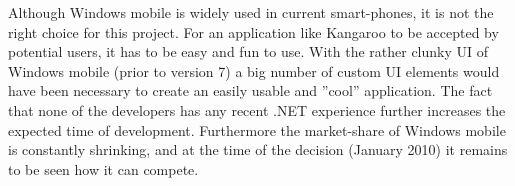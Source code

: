 Although Windows mobile is widely used in current smart-phones, it is not the right choice for this project. For an application like Kangaroo to be accepted by potential users, it has to be easy and fun to use. With the rather clunky UI of Windows mobile (prior to version 7) a big number of custom UI elements would have been necessary to create an easily usable and ''cool'' application. The fact that none of the developers has any recent .NET experience further increases the expected time of development. Furthermore the market-share of Windows mobile is constantly shrinking, and at the time of the decision (January 2010) it remains to be seen how it can compete. 